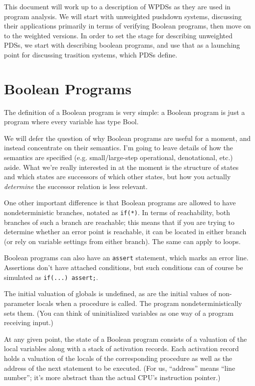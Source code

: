 \documentclass{article}
\newcommand{\Code}[1]{\texttt{#1}}
\begin{document}
This document will work up to a description of WPDSs as they are used
in program analysis. We will start with unweighted pushdown systems,
discussing their applications primarily in terms of verifying Boolean
programs, then move on to the weighted versions. In order to set the
stage for describing unweighted PDSs, we start with describing boolean
programs, and use that as a launching point for discussing trasition
systems, which PDSs define.

\section{Boolean Programs}
The definition of a Boolean program is very simple: a Boolean program
is just a program where every variable has type Bool.

We will defer the question of why Boolean programs are useful for a
moment, and instead concentrate on their semantics. I'm going to leave
details of how the semantics are specified (e.g. small/large-step
operational, denotational, etc.) aside. What we're really interested
in at the moment is the structure of states and which states are
successors of which other states, but how you actually
\emph{determine} the successor relation is less relevant.

One other important difference is that Boolean programs are allowed to
have nondeterministic branches, notated as \Code{if(*)}. In terms of
reachability, both branches of such a branch are reachable; this means
that if you are trying to determine whether an error point is
reachable, it can be located in either branch (or rely on variable
settings from either branch). The same can apply to loops.

Boolean programs can also have an \Code{assert} statement, which marks
an error line. Assertions don't have attached conditions, but such
conditions can of course be simulated as \Code{if(...) assert;}.

The initial valuation of globals is undefined, as are the initial
values of non-parameter locals when a procedure is called. The program
nondeterministically sets them. (You can think of uninitialized
variables as one way of a program receiving input.)

At any given point, the state of a Boolean program consists of a
valuation of the local variables along with a stack of activation
records. Each activation record holds a valuation of the locals of the
corresponding procedure as well as the address of the next statement
to be executed. (For us, ``address'' means ``line number''; it's more
abstract than the actual CPU's instruction pointer.)
\end{document}
